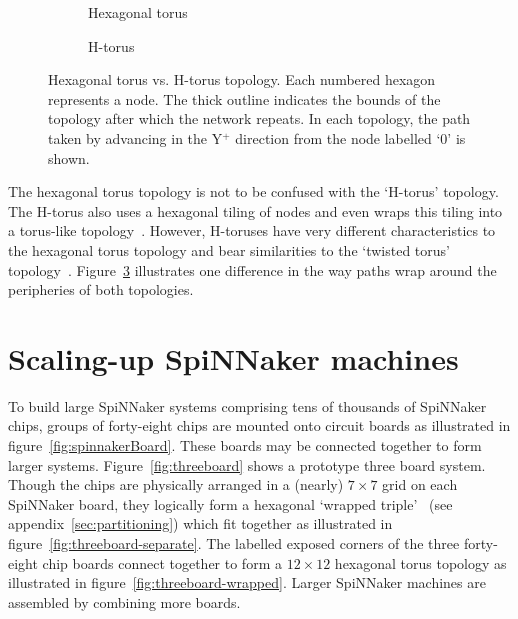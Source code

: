 		\begin{figure}
			\center
			\begin{subfigure}[b]{0.45\linewidth}
				\center
				\caption{Hexagonal torus}
				\label{fig:topo-compare-hexagonal-torus}
			\end{subfigure}
			\begin{subfigure}[b]{0.45\linewidth}
				\center
				\caption{H-torus}
				\label{fig:topo-compare-h-torus}
			\end{subfigure}
			
			\caption[Hexagonal torus vs. H-torus topology.]%
			{Hexagonal torus vs. H-torus topology. Each numbered hexagon
			represents a node. The thick outline indicates the bounds of the
			topology after which the network repeats. In each topology, the path
			taken by advancing in the Y$^+$ direction from the node labelled `0' is
			shown.}
			\label{fig:topo-compare}
		\end{figure}
		
		\label{sec:hex-vs-h-torus}
		
		The hexagonal torus topology is not to be confused with the `H-torus'
		topology. The H-torus also uses a hexagonal tiling of nodes and even wraps
		this tiling into a torus-like topology~\cite{zhao08}. However, H-toruses
		have very different characteristics to the hexagonal torus topology and
		bear similarities to the `twisted torus' topology~\cite{camara10}.
		Figure~\ref{fig:topo-compare} illustrates one difference in the way paths
		wrap around the peripheries of both topologies.
	
	\section{Scaling-up SpiNNaker machines}
		
		To build large SpiNNaker systems comprising tens of thousands of SpiNNaker
		chips, groups of forty-eight chips are mounted onto circuit boards as
		illustrated in figure~\ref{fig:spinnakerBoard}. These boards may be
		connected together to form larger systems.  Figure~\ref{fig:threeboard}
		shows a prototype three board system. Though the chips are physically
		arranged in a (nearly) $7\times7$ grid on each SpiNNaker board, they
		logically form a hexagonal `wrapped triple'~\cite{davidsonWiring} (see
		appendix~\ref{sec:partitioning}) which fit together as illustrated in
		figure~\ref{fig:threeboard-separate}. The labelled exposed corners of the
		three forty-eight chip boards connect together to form a $12\times12$
		hexagonal torus topology as illustrated in
		figure~\ref{fig:threeboard-wrapped}. Larger SpiNNaker machines are
		assembled by combining more boards.
		
